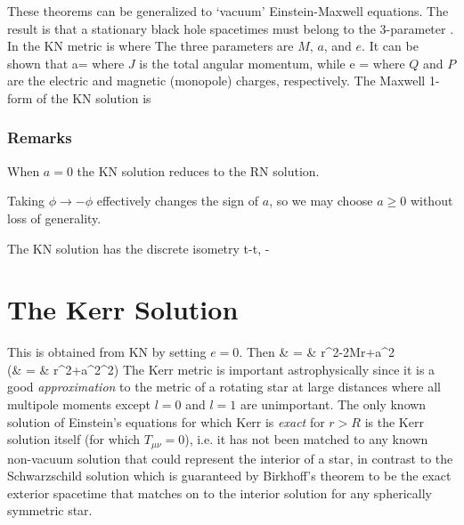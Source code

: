 These theorems can be generalized to `vacuum' Einstein-Maxwell equations.  
The result is that a stationary black hole spacetimes must belong to the
3-parameter .  In   the KN metric is
where
The three parameters are $M$, $a$, and $e$.  It can be shown that
\be
a=
\ee
where $J$ is the total angular momentum, while
\be
e = 
\ee
where $Q$ and $P$ are the electric and magnetic (monopole) charges, 
respectively.  The Maxwell 1-form of the KN solution is 
\subsubsection{Remarks}
\begin{list}{()}
{}
\item When $a=0$ the KN solution reduces to the RN solution.
\item Taking $\phi \to -\phi$ effectively changes the sign of $a$, so we 
may choose $a \ge 0$ without loss of generality.
\item  The KN solution has the discrete isometry
\be
t\to -t, \quad \phi \to -\phi
\ee
\end{list}

\section{The Kerr Solution}

This is obtained from KN by setting $e=0$.  Then
\bea
\Delta & = & r^2-2Mr+a^2 \\
(\Sigma & = & r^2+a^2\cos^2\theta ) 
\eea
The Kerr metric is important astrophysically since it 
is a good \emph{approximation} to the metric of a rotating star at large
distances where all multipole moments except $l=0$ and $l=1$ are unimportant. 
The only known solution of Einstein's equations for which Kerr is \emph{exact}
for $r>R$ is the Kerr solution itself (for which $T_{\mu\nu}=0$), i.e. it has
not been matched to any known non-vacuum solution that could represent the
interior of a star, in contrast to the Schwarzschild solution which is
guaranteed by Birkhoff's theorem to be the exact exterior spacetime that
matches on to the interior solution for any spherically symmetric star. \\

